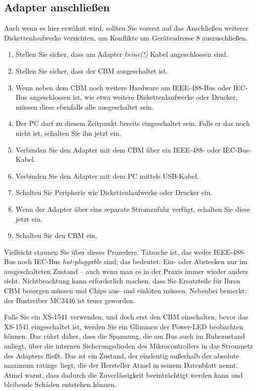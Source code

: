 \documentclass[10pt,a4paper]{scrartcl}		%
\begin{document}
\subsection{Adapter anschließen}
Auch wenn es hier erwähnt wird, sollten Sie vorerst auf das Anschließen
weiterer Diskettenlaufwerke verzichten, um Konflikte um Geräteadresse 8
auszuschließen.
\begin{enumerate}
\item Stellen Sie sicher, dass am Adapter \textit{keine(!)} Kabel angeschlossen sind.
\item Stellen Sie sicher, dass der CBM ausgeschaltet ist.
\item Wenn neben dem CBM noch weitere Hardware am IEEE-488-Bus oder IEC-Bus
angeschlossen ist, wie etwa weitere Diskettenlaufwerke oder Drucker,
müssen diese ebenfalls alle ausgeschaltet sein.
\item Der PC darf zu diesem Zeitpunkt bereits eingeschaltet sein. Falls er das noch nicht ist, schalten Sie ihn jetzt ein.
\item Verbinden Sie den Adapter mit dem CBM über ein IEEE-488- oder IEC-Bus-Kabel.
\item Verbinden Sie den Adapter mit dem PC mittels USB-Kabel.
\item Schalten Sie Peripherie wie Diskettenlaufwerke oder Drucker ein.
\item Wenn der Adapter über eine separate Stromzufuhr verfügt, schalten Sie diese jetzt ein.
\item Schalten Sie den CBM ein.
\end{enumerate}

Vielleicht staunen Sie über dieses Prozedere. Tatsache ist, das weder
IEEE-488-Bus noch IEC-Bus \textit{hot-pluggable} sind; das bedeutet:
Ein- oder Abstecken nur im ausgeschalteten Zustand -- auch wenn man es in
der Praxis immer wieder anders sieht. Nichtbeachtung kann erforderlich
machen, dass Sie Ersatzteile für Ihren CBM besorgen müssen und Chips
aus- und einlöten müssen. Nebenbei bemerkt: der Bustreiber MC3446 ist
teuer geworden.

Falls Sie ein XS-1541 verwenden, und doch erst den CBM einschalten, bevor
das XS-1541 eingeschaltet ist, werden Sie ein Glimmen der Power-LED
beobachten können. Das rührt daher, dass die Spannung, die am Bus auch im
Ruhezustand anliegt, über die internen Sicherungsdioden des Mikrocontrollers
in das Stromnetz des Adapters fließt. Das ist ein Zustand, der
eindeutig außerhalb der \glqq absolute maximum ratings\grqq\ liegt,
die der Hersteller Atmel in seinem Datenblatt nennt. Atmel warnt,
dass dadurch die Zuverlässigkeit beeinträchtigt werden kann und bleibende
Schäden entstehen können. 
\end{document}
